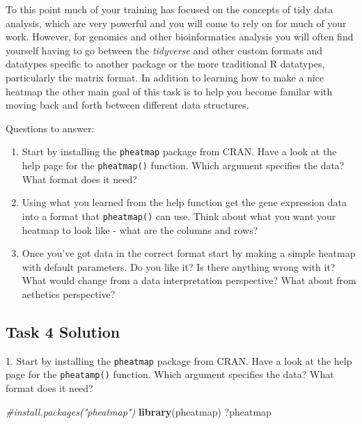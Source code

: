 \documentclass[]{book}
\newenvironment{Shaded}{\begin{snugshade}}{\end{snugshade}}
\newcommand{\CommentTok}[1]{\textcolor[rgb]{0.56,0.35,0.01}{\textit{#1}}}
\newcommand{\KeywordTok}[1]{\textcolor[rgb]{0.13,0.29,0.53}{\textbf{#1}}}
\newcommand{\NormalTok}[1]{#1}
\providecommand{\tightlist}{%
  \setlength{\itemsep}{0pt}\setlength{\parskip}{0pt}}
\begin{document}
To this point much of your training has focused on the concepts of tidy data analysis, which are very powerful and you will come to rely on for much of your work. However, for genomics and other bioinformatics analysis you will often find yourself having to go between the \emph{tidyverse} and other custom formats and datatypes specific to another package or the more traditional R datatypes, particularly the matrix format. In addition to learning how to make a nice heatmap the other main goal of this task is to help you become familar with moving back and forth between different data structures.

Questions to answer:

\begin{enumerate}
\def\labelenumi{\arabic{enumi}.}
\tightlist
\item
  Start by installing the \texttt{pheatmap} package from CRAN. Have a look at the help page for the \texttt{pheatmap()} function. Which argument specifies the data? What format does it need?
\item
  Using what you learned from the help function get the gene expression data into a format that \texttt{pheatmap()} can use. Think about what you want your heatmap to look like - what are the columns and rows?
\item
  Once you've got data in the correct format start by making a simple heatmap with default parameters. Do you like it? Is there anything wrong with it? What would change from a data interpretation perspective? What about from aethetics perspective?
\end{enumerate}

\hypertarget{task-4-solution}{%
\subsection*{Task 4 Solution}\label{task-4-solution}}

1. Start by installing the \texttt{pheatmap} package from CRAN. Have a look at the help page for the \texttt{pheatamp()} function. Which argument specifies the data? What format does it need?

\begin{Shaded}
\begin{Highlighting}[]
\CommentTok{#install.packages("pheatmap")}
\KeywordTok{library}\NormalTok{(pheatmap)}
\NormalTok{?pheatmap}
\end{Highlighting}
\end{Shaded}
\end{document}
